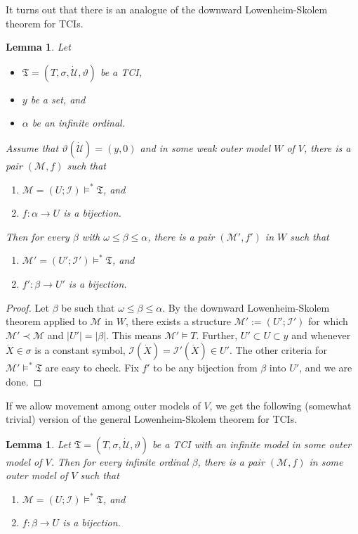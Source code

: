 \documentclass[12pt, twoside]{memoir}
\numberwithin{equation}{section}
\newtheorem{lem}[thm]{Lemma}
\theoremstyle{definition}
\theoremstyle{remark}
\theoremstyle{definition}
\theoremstyle{definition}
\theoremstyle{definition}
\theoremstyle{remark}
\begin{document}
It turns out that there is an analogue of the downward Lowenheim-Skolem theorem for TCIs.

\begin{lem}\label{DLS}
Let 
\begin{itemize}
    \item $\mathfrak{T} = (T, \sigma, \dot{\mathcal{U}}, \vartheta)$ be a TCI,
    \item $y$ be a set, and
    \item $\alpha$ be an infinite ordinal. 
\end{itemize}
Assume that $\vartheta(\dot{\mathcal{U}}) = (y, 0)$ and in some weak outer model $W$ of $V$, there is a pair $(\mathcal{M}, f)$ such that
\begin{enumerate}[label=(\alph*)]
    \item $\mathcal{M} = (U; \mathcal{I}) \models^* \mathfrak{T}$, and
    \item $f : \alpha \longrightarrow U$ is a bijection.
\end{enumerate}
Then for every $\beta$ with $\omega \leq \beta \leq \alpha$, there is a pair $(\mathcal{M}', f')$ in $W$ such that 
\begin{enumerate}[label=(\alph*)']
    \item $\mathcal{M}' = (U'; \mathcal{I}') \models^* \mathfrak{T}$, and
    \item $f' : \beta \longrightarrow U'$ is a bijection.
\end{enumerate}
\end{lem}

\begin{proof}
Let $\beta$ be such that $\omega \leq \beta \leq \alpha$. By the downward Lowenheim-Skolem theorem applied to $\mathcal{M}$ in $W$, there exists a structure $\mathcal{M}' := (U'; \mathcal{I}')$ for which $\mathcal{M}' \prec \mathcal{M}$ and $|U'| = |\beta|$. This means $\mathcal{M'} \models T$. Further, $U' \subset U \subset y$ and whenever $\dot{X} \in \sigma$ is a constant symbol, $\mathcal{I}(\dot{X}) = \mathcal{I}'(\dot{X}) \in U'$. The other criteria for $\mathcal{M}' \models^* \mathfrak{T}$ are easy to check. Fix $f'$ to be any bijection from $\beta$ into $U'$, and we are done.
\end{proof}

If we allow movement among outer models of $V$, we get the following (somewhat trivial) version of the general Lowenheim-Skolem theorem for TCIs.

\begin{lem}\label{GLS}
Let $\mathfrak{T} = (T, \sigma, \dot{\mathcal{U}}, \vartheta)$ be a TCI with an infinite model in some outer model of $V$. Then for every infinite ordinal $\beta$, there is a pair $(\mathcal{M}, f)$ in some outer model of $V$ such that 
\begin{enumerate}[label=(\alph*)]
    \item $\mathcal{M} = (U; \mathcal{I}) \models^* \mathfrak{T}$, and
    \item $f : \beta \longrightarrow U$ is a bijection.
\end{enumerate}
\end{lem}
\end{document}
